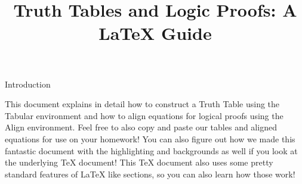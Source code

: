 \documentclass{article}
\title{\vspace{-4em}Truth Tables and Logic Proofs: A \LaTeX{} Guide\vspace{-3em}}
\date{}
\author{}
\begin{document}

\maketitle

\begin{section}{Introduction}

This document explains in detail how to construct a Truth Table using the Tabular environment and how to align equations for logical proofs using the Align environment. Feel free to also copy and paste our tables and aligned equations for use on your homework! You can also figure out how we made this fantastic document with the highlighting and backgrounds as well if you look at the underlying TeX document! This TeX document also uses some pretty standard features of \LaTeX{} like sections, so you can also learn how those work!
\end{section}
\end{document}

